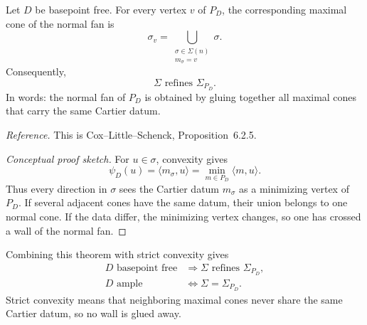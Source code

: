 \begin{theorem}
\label{thm:normal-fan-divisor-polytope}
Let \(D\) be basepoint free. For every vertex \(v\) of \(P_D\), the
corresponding maximal cone of the normal fan is
\[
\sigma_v
=
\bigcup_{\substack{\sigma\in\Sigma(n)\\m_\sigma=v}}
\sigma.
\]
Consequently,
\[
\boxed{
\Sigma\text{ refines }\Sigma_{P_D}.
}
\]
In words: the normal fan of \(P_D\) is obtained by gluing together all
maximal cones that carry the same Cartier datum.
\end{theorem}

\noindent
\textit{Reference.}
This is Cox--Little--Schenck, Proposition~6.2.5.

\begin{proof}[Conceptual proof sketch]
For \(u\in\sigma\), convexity gives
\[
\psi_D(u)
=
\langle m_\sigma,u\rangle
=
\min_{m\in P_D}\langle m,u\rangle.
\]
Thus every direction in \(\sigma\) sees the Cartier datum
\(m_\sigma\) as a minimizing vertex of \(P_D\). If several adjacent
cones have the same datum, their union belongs to one normal cone.
If the data differ, the minimizing vertex changes, so one has crossed
a wall of the normal fan.
\end{proof}

Combining this theorem with strict convexity gives
\[
\boxed{
\begin{aligned}
D\text{ basepoint free}
&\Longrightarrow
\Sigma\text{ refines }\Sigma_{P_D},
\\[1mm]
D\text{ ample}
&\Longleftrightarrow
\Sigma=\Sigma_{P_D}.
\end{aligned}
}
\]
Strict convexity means that neighboring maximal cones never share the
same Cartier datum, so no wall is glued away.

